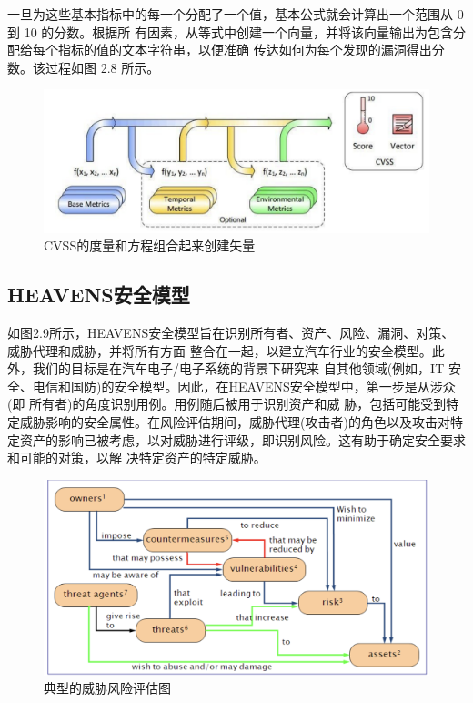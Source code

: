 一旦为这些基本指标中的每一个分配了一个值，基本公式就会计算出一个范围从 0 到 10 的分数。根据所
有因素，从等式中创建一个向量，并将该向量输出为包含分配给每个指标的值的文本字符串，以便准确
传达如何为每个发现的漏洞得出分数。该过程如图 2.8 所示。
\begin{figure}
    \centering
    \includegraphics[scale=0.6]{resources/img/i9.png}
    \caption{CVSS的度量和方程组合起来创建矢量}
  \end{figure}

  \subsection{HEAVENS安全模型}
  如图2.9所示，HEAVENS安全模型\cite{haringajoint}旨在识别所有者、资产、风险、漏洞、对策、威胁代理和威胁，并将所有方面
整合在一起，以建立汽车行业的安全模型。此外，我们的目标是在汽车电子/电子系统的背景下研究来
自其他领域(例如，IT 安全、电信和国防)的安全模型。因此，在HEAVENS安全模型中，第一步是从涉众(即
所有者)的角度识别用例。用例随后被用于识别资产和威
胁，包括可能受到特定威胁影响的安全属性。在风险评估期间，威胁代理(攻击者)的角色以及攻击对特
定资产的影响已被考虑，以对威胁进行评级，即识别风险。这有助于确定安全要求和可能的对策，以解
决特定资产的特定威胁。

\begin{figure}
    \centering
    \includegraphics[scale=0.6]{resources/img/i10.png}
    \caption{典型的威胁风险评估图}
  \end{figure}

